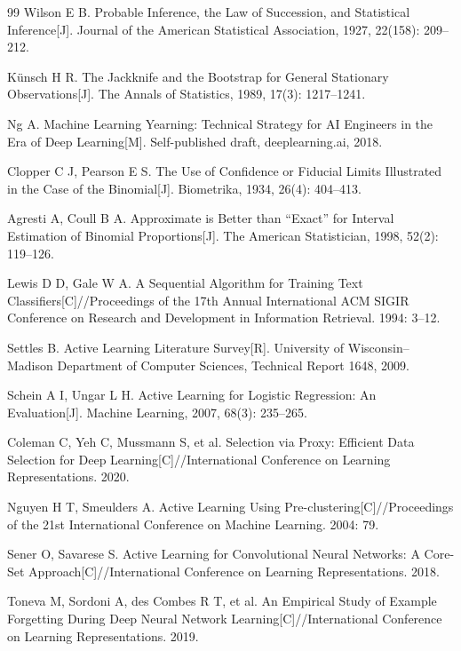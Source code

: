 \documentclass[UTF8,openany,12pt]{ctexbook}
\begin{document}
\begin{thebibliography}{99}
Wilson E B. Probable Inference, the Law of Succession, and Statistical Inference[J]. Journal of the American Statistical Association, 1927, 22(158): 209--212.

K\"unsch H R. The Jackknife and the Bootstrap for General Stationary Observations[J]. The Annals of Statistics, 1989, 17(3): 1217--1241.

Ng A. Machine Learning Yearning: Technical Strategy for AI Engineers in the Era of Deep Learning[M]. Self-published draft, deeplearning.ai, 2018.

Clopper C J, Pearson E S. The Use of Confidence or Fiducial Limits Illustrated in the Case of the Binomial[J]. Biometrika, 1934, 26(4): 404--413.

Agresti A, Coull B A. Approximate is Better than ``Exact'' for Interval Estimation of Binomial Proportions[J]. The American Statistician, 1998, 52(2): 119--126.

Lewis D D, Gale W A. A Sequential Algorithm for Training Text Classifiers[C]//Proceedings of the 17th Annual International ACM SIGIR Conference on Research and Development in Information Retrieval. 1994: 3--12.

Settles B. Active Learning Literature Survey[R]. University of Wisconsin--Madison Department of Computer Sciences, Technical Report 1648, 2009.

Schein A I, Ungar L H. Active Learning for Logistic Regression: An Evaluation[J]. Machine Learning, 2007, 68(3): 235--265.

Coleman C, Yeh C, Mussmann S, et al. Selection via Proxy: Efficient Data Selection for Deep Learning[C]//International Conference on Learning Representations. 2020.

Nguyen H T, Smeulders A. Active Learning Using Pre-clustering[C]//Proceedings of the 21st International Conference on Machine Learning. 2004: 79.

Sener O, Savarese S. Active Learning for Convolutional Neural Networks: A Core-Set Approach[C]//International Conference on Learning Representations. 2018.

Toneva M, Sordoni A, des Combes R T, et al. An Empirical Study of Example Forgetting During Deep Neural Network Learning[C]//International Conference on Learning Representations. 2019.


\end{thebibliography}
\end{document}
